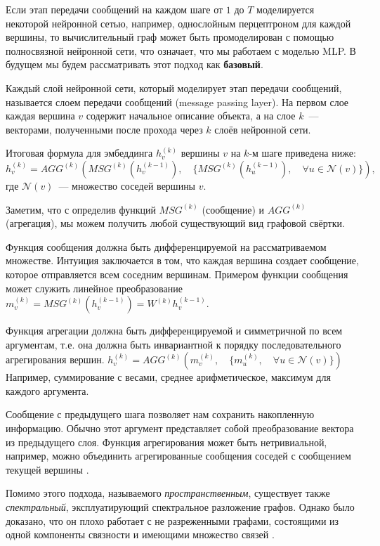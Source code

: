 \documentclass[12pt]{article}
\begin{document}
Если этап передачи сообщений на каждом шаге от $1$ до $T$ моделируется некоторой нейронной сетью, например, однослойным перцептроном для каждой вершины, то вычислительный граф может быть промоделирован с помощью полносвязной нейронной сети, что означает, что мы работаем с моделью MLP. В будущем мы будем рассматривать этот подход как \textbf{базовый}.

Каждый слой нейронной сети, который моделирует этап передачи сообщений, называется слоем передачи сообщений (message passing layer). На первом слое каждая вершина $v$ содержит начальное описание объекта, а на слое $k$~--- векторами, полученными после прохода через $k$ слоёв нейронной сети.

Итоговая формула для эмбеддинга $h_v^{(k)}$ вершины $v$ на $k$-м шаге приведена ниже:
$$
h_v^{(k)} = AGG^{(k)}(MSG^{(k)}(h_v^{(k-1)}), \quad \{MSG^{(k)}(h_u^{(k-1)}) , \quad \forall u \in \mathcal{N}(v)\}),
$$
где $\mathcal{N}(v)$~--- множество соседей вершины $v$.

Заметим, что с определив функций $MSG^{(k)}$ (сообщение) и $AGG^{(k)}$ (агрегация), мы можем получить любой существующий вид графовой свёртки.

Функция сообщения должна быть дифференцируемой на рассматриваемом множестве. Интуиция заключается в том, что каждая вершина создает сообщение, которое отправляется всем соседним вершинам. Примером функции сообщения может служить линейное преобразование $m_v^{(k)}=MSG^{(k)}(h_v^{(k-1)})=W^{(k)}h_v^{(k-1)}$.

Функция агрегации должна быть дифференцируемой и симметричной по всем аргументам, т.е. она должна быть инвариантной к порядку последовательного агрегирования вершин. $h_v^{(k)}=AGG^{(k)}(m_v^{(k)}, \quad \{m_u^{(k)} , \quad \forall u \in \mathcal{N}(v)\})$ Например, суммирование с весами, среднее арифметическое, максимум для каждого аргумента.

Сообщение с предыдущего шага позволяет нам сохранить накопленную информацию. Обычно этот аргумент представляет собой преобразование вектора из предыдущего слоя. Функция агрегирования может быть нетривиальной, например, можно объединить агрегированные сообщения соседей с сообщением текущей вершины \cite{hamilton2017inductive}.

Помимо этого подхода, называемого \textit{пространственным}, существует также \textit{спектральный}, эксплуатирующий спектральное разложение графов. Однако было доказано, что он плохо работает с не разреженными графами, состоящими из одной компоненты связности и имеющими множество связей \cite{zhou2020graph}.
\end{document}
